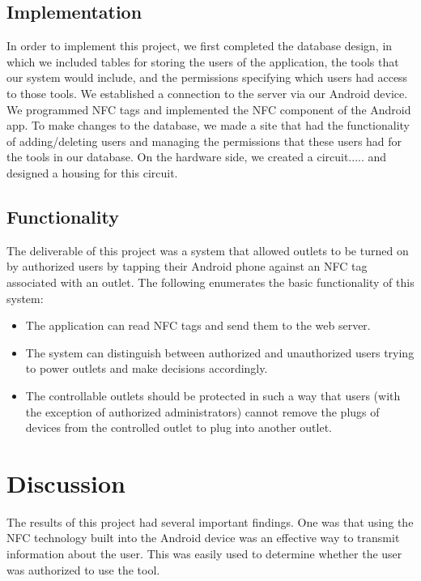 \documentclass{sigchi}
\begin{document}
\subsection{Implementation}
In order to implement this project, we first completed the database design, in which we included tables for storing the users of the application, the tools that our system would include, and the permissions specifying which users had access to those tools. 
We established a connection to the server via our Android device.
We programmed NFC tags and implemented the NFC component of the Android app.
To make changes to the database, we made a site that had the functionality of adding/deleting users and managing the permissions that these users had for the tools in our database.
On the hardware side, we created a circuit..... and designed a housing for this circuit.

\subsection {Functionality}
The deliverable of this project was a system that allowed outlets to be turned on by authorized users by tapping their Android phone against an NFC tag associated with an outlet. The following enumerates the basic functionality of this system:
\begin{itemize}
\item The application can read NFC tags and send them to the web server.

\item The system can distinguish between authorized and unauthorized users trying to power outlets and make decisions accordingly. 

\item The controllable outlets should be protected in such a way that users (with the exception of authorized administrators) cannot remove the plugs of devices from the controlled outlet to plug into another outlet.
\end{itemize}

\section{Discussion}

The results of this project had several important findings. One was that using the NFC technology built into the Android device was an effective way to transmit information about the user. This was easily used to determine whether the user was authorized to use the tool.
\end{document}
